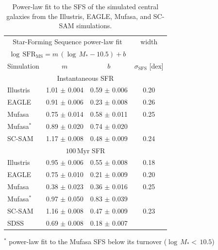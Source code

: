 \documentclass[tighten, preprint]{aastex62}
\begin{document}
\begin{table}
\caption{Power-law fit to the SFS of the simulated central galaxies from the
Illustris, EAGLE, {\sc Mufasa}, and SC-SAM simulations.} 
\begin{center}
\begin{tabular}{p{3cm}ccc} \toprule
\multicolumn{3}{c}{Star-Forming Sequence power-law fit} & width \\ [3pt]
\multicolumn{3}{c}{$\log\,\mathrm{SFR}_\mathrm{MS} = m\,(\log\,M_* - 10.5) + b$  } & \\ [3pt]
Simulation & $m$ & $b$ & $\sigma_\mathrm{SFS}$ [dex] \\ 
\hline
\multicolumn{4}{c}{Instantaneous SFR} \\
Illustris 			& 1.01 $\pm$ 0.004 & 0.59 $\pm$ 0.006 & 0.20 \\ 
EAGLE 				& 0.91 $\pm$ 0.006 & 0.23 $\pm$ 0.008 & 0.26 \\ 
{\sc Mufasa} 		& 0.75 $\pm$ 0.014 & 0.58 $\pm$ 0.011 & 0.25 \\ 
{\sc Mufasa}$^*$ 	& 0.89 $\pm$ 0.020 & 0.74 $\pm$ 0.020 &  \\ 
SC-SAM 				& 1.17 $\pm$ 0.008 & 0.48 $\pm$ 0.009 & 0.24 \\ 
\hline \hline
\multicolumn{4}{c}{$100\,\mathrm{Myr}$ SFR} \\
Illustris 			& 0.95 $\pm$ 0.006 & 0.55 $\pm$ 0.008 & 0.18 \\
EAGLE  				& 0.75 $\pm$ 0.010 & 0.21 $\pm$ 0.009 & 0.20 \\
{\sc Mufasa}		& 0.38 $\pm$ 0.023 & 0.36 $\pm$ 0.016 & 0.25 \\
{\sc Mufasa}$^*$ 	& 0.97 $\pm$ 0.050 & 0.83 $\pm$ 0.039 & \\ 
SC-SAM 				& 1.16 $\pm$ 0.008 & 0.47 $\pm$ 0.009 & 0.23\\ 
\hline
\hline \hspace{10pt}
SDSS 				& 0.69 $\pm$ 0.008 & 0.18 $\pm$ 0.007 \\ 
\hline
\end{tabular} \label{tab:sfms_powerlaw}
\end{center}
$^*$ power-law fit to the {\sc Mufasa} SFS below its turnover ($\log\,M_* {<}\,10.5$)
\end{table}
\end{document}
